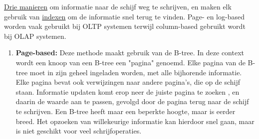 	\underline{Drie manieren} om informatie naar de schijf weg te schrijven, en maken elk gebruik van \underline{indexen} om de informatie snel terug te vinden. Page- en log-based worden vaak gebruikt bij OLTP systemen terwijl column-based gebruikt wordt bij OLAP systemen.
	\begin{enumerate}
		\item[\info] \textbf{Page-based:} Deze methode maakt gebruik van de B-tree. In deze context wordt een knoop van een B-tree een "pagina" genoemd. Elke pagina van de B-tree moet in zijn geheel ingeladen worden, met alle bijhorende informatie. Elke pagina bevat ook verwijzingen naar andere pagina's, die op de schijf staan. Informatie updaten komt erop neer de juiste pagina te zoeken , en daarin de waarde aan te passen, gevolgd door de pagina terug naar de schijf te schrijven. Een B-tree heeft maar een beperkte hoogte, maar is eerder breed. Het opzoeken van willekeurige informatie kan hierdoor snel gaan, maar is niet geschikt voor veel schrijfoperaties.


\end{enumerate}
